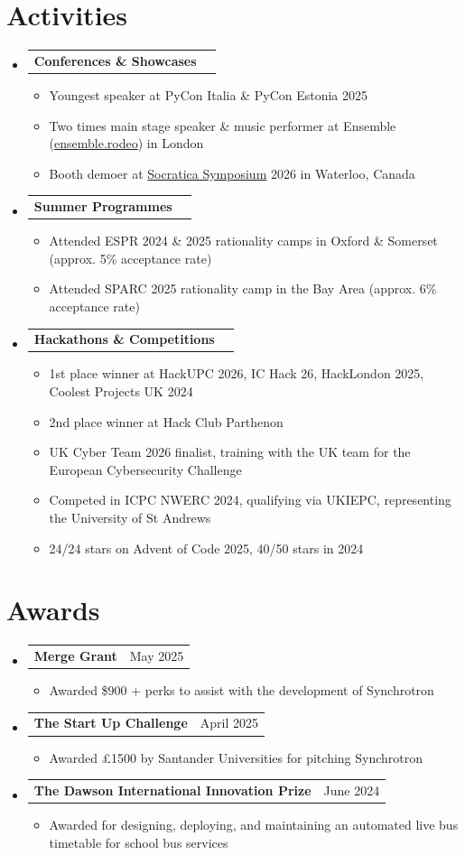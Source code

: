\documentclass[letterpaper,11pt]{article}
\makeatletter
\newcommand{\resumeItem}[1]{
  \item\small{
    {#1 \vspace{-2pt}}
  }
}
\newcommand{\resumeProjectHeading}[2]{
    \item
    \begin{tabular*}{0.97\textwidth}{l@{\extracolsep{\fill}}r}
      \textbf{#1} & #2 \\
    \end{tabular*}\vspace{-7pt}
}
\newcommand{\resumeSubHeadingListStart}{\begin{itemize}[leftmargin=0.15in, label={}]}
\newcommand{\resumeSubHeadingListEnd}{\end{itemize}}
\newcommand{\resumeItemListStart}{\begin{itemize}}
\newcommand{\resumeItemListEnd}{\end{itemize}\vspace{-5pt}}
\makeatother
\begin{document}
\section{Activities}
    \resumeSubHeadingListStart
      \resumeProjectHeading
        {Conferences \& Showcases}{}
        \resumeItemListStart
          \resumeItem{Youngest speaker at PyCon Italia \& PyCon Estonia 2025}
          \resumeItem{Two times main stage speaker \& music performer at Ensemble (\href{https://ensemble.rodeo}{ensemble.rodeo}) in London}
          \resumeItem{Booth demoer at \href{https://symposium.socratica.info/}{Socratica Symposium} 2026 in Waterloo, Canada}
        \resumeItemListEnd
      \resumeProjectHeading
        {Summer Programmes}{}
        \resumeItemListStart
          \resumeItem{Attended ESPR 2024 \& 2025 rationality camps in Oxford \& Somerset (approx. 5\% acceptance rate)}
          \resumeItem{Attended SPARC 2025 rationality camp in the Bay Area (approx. 6\% acceptance rate)}
        \resumeItemListEnd
      \resumeProjectHeading
        {Hackathons \& Competitions}{}
        \resumeItemListStart
          \resumeItem{1st place winner at HackUPC 2026, IC Hack 26, HackLondon 2025, Coolest Projects UK 2024}
          \resumeItem{2nd place winner at Hack Club Parthenon}
          \resumeItem{UK Cyber Team 2026 finalist, training with the UK team for the European Cybersecurity Challenge}
          \resumeItem{Competed in ICPC NWERC 2024, qualifying via UKIEPC, representing the University of St Andrews}
          \resumeItem{24/24 stars on Advent of Code 2025, 40/50 stars in 2024}
        \resumeItemListEnd
    \resumeSubHeadingListEnd

\section{Awards}
    \resumeSubHeadingListStart
      \resumeProjectHeading
        {Merge Grant}{May 2025}
        \resumeItemListStart
          \resumeItem{Awarded \$900 + perks to assist with the development of Synchrotron}
        \resumeItemListEnd
      \resumeProjectHeading
        {The Start Up Challenge}{April 2025}
        \resumeItemListStart
          \resumeItem{Awarded £1500 by Santander Universities for pitching Synchrotron}
        \resumeItemListEnd
      \resumeProjectHeading
        {The Dawson International Innovation Prize}{June 2024}
        \resumeItemListStart
          \resumeItem{Awarded for designing, deploying, and maintaining an automated live bus timetable for school bus services}
        \resumeItemListEnd
    \resumeSubHeadingListEnd
\end{document}
